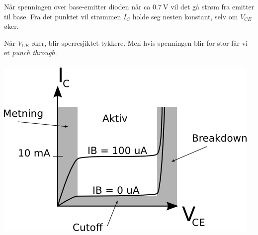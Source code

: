 Når spenningen over base-emitter dioden når ca $\SI{0.7}{\volt}$
vil det gå strøm fra emitter til base.
Fra det punktet vil strømmen $I_C$ holde seg nesten konstant,
selv om $V_{CE}$ øker.

Når $V_{CE}$ øker, blir sperresjiktet tykkere.
Men hvis spenningen blir for stor får vi et \emph{punch through}.
\\\\
\includegraphics[width=\textwidth]{./img/npn-virkeomrade}
